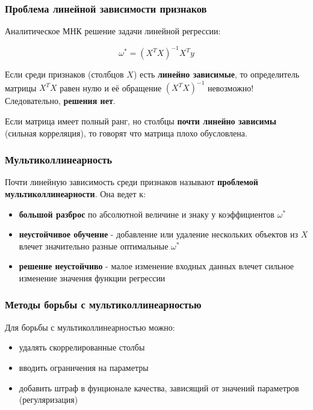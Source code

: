 \documentclass{beamer}
\begin{document}
	
	\begin{frame}
		\frametitle{Проблема линейной зависимости признаков}
		Аналитическое МНК решение задачи линейной регрессии:
		
		$$ \omega^{*} = (X^{T}X)^{-1} X^{T} y $$
		
		\vspace{5pt}
		
		Если среди признаков (столбцов $X$) есть \textbf{линейно зависимые}, то определитель матрицы $X^{T}X$ равен нулю и её обращение $(X^{T}X)^{-1}$ невозможно! Следовательно, \textbf{решения нет}.
		
		\vspace{15pt}
		Если матрица имеет полный ранг, но столбцы \textbf{почти линейно зависимы} (сильная корреляция), то говорят что матрица плохо обусловлена.
	\end{frame}
	
	
	\begin{frame}
		\frametitle{Мультиколлинеарность}
		Почти линейную зависимость среди признаков называют \textbf{проблемой мультиколлинеарности}. Она ведет к:
		
		\vspace{5pt}
		
		\begin{itemize}
			\item \textbf{большой разброс} по абсолютной величине и знаку у коэффициентов $\omega^{*}$
			
			\item \textbf{неустойчивое обучение} - добавление или удаление нескольких объектов из $X$ влечет значительно разные оптимальные $\omega^{*}$
			
			\item \textbf{решение неустойчиво} - малое изменение входных данных влечет сильное изменение значения функции регрессии
		\end{itemize}
	\end{frame}
	
	\begin{frame}
		\frametitle{Методы борьбы с мультиколлинеарностью} 
		Для борьбы с мультиколлинеарностью можно:
		\begin{itemize}
			\item удалять скоррелированные столбы 
			\item вводить ограничения на параметры
			\item добавить штраф  в фунционале качества, зависящий от значений параметров (регуляризация)
		\end{itemize}
	\end{frame}
	
\end{document}
